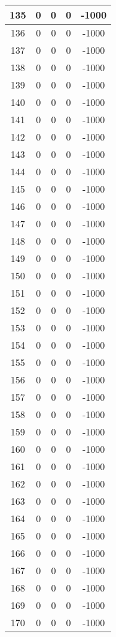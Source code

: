 \documentclass[letterpaper, 12pt]{article}
\begin{document}
\begin{longtable}{|c|c|c|c|c|}
\hline
135 & 0 & 0 & 0 & -1000 \\
\hline
136 & 0 & 0 & 0 & -1000 \\
\hline
137 & 0 & 0 & 0 & -1000 \\
\hline
138 & 0 & 0 & 0 & -1000 \\
\hline
139 & 0 & 0 & 0 & -1000 \\
\hline
140 & 0 & 0 & 0 & -1000 \\
\hline
141 & 0 & 0 & 0 & -1000 \\
\hline
142 & 0 & 0 & 0 & -1000 \\
\hline
143 & 0 & 0 & 0 & -1000 \\
\hline
144 & 0 & 0 & 0 & -1000 \\
\hline
145 & 0 & 0 & 0 & -1000 \\
\hline
146 & 0 & 0 & 0 & -1000 \\
\hline
147 & 0 & 0 & 0 & -1000 \\
\hline
148 & 0 & 0 & 0 & -1000 \\
\hline
149 & 0 & 0 & 0 & -1000 \\
\hline
150 & 0 & 0 & 0 & -1000 \\
\hline
151 & 0 & 0 & 0 & -1000 \\
\hline
152 & 0 & 0 & 0 & -1000 \\
\hline
153 & 0 & 0 & 0 & -1000 \\
\hline
154 & 0 & 0 & 0 & -1000 \\
\hline
155 & 0 & 0 & 0 & -1000 \\
\hline
156 & 0 & 0 & 0 & -1000 \\
\hline
157 & 0 & 0 & 0 & -1000 \\
\hline
158 & 0 & 0 & 0 & -1000 \\
\hline
159 & 0 & 0 & 0 & -1000 \\
\hline
160 & 0 & 0 & 0 & -1000 \\
\hline
161 & 0 & 0 & 0 & -1000 \\
\hline
162 & 0 & 0 & 0 & -1000 \\
\hline
163 & 0 & 0 & 0 & -1000 \\
\hline
164 & 0 & 0 & 0 & -1000 \\
\hline
165 & 0 & 0 & 0 & -1000 \\
\hline
166 & 0 & 0 & 0 & -1000 \\
\hline
167 & 0 & 0 & 0 & -1000 \\
\hline
168 & 0 & 0 & 0 & -1000 \\
\hline
169 & 0 & 0 & 0 & -1000 \\
\hline
170 & 0 & 0 & 0 & -1000 \\

\end{longtable}
\end{document}

